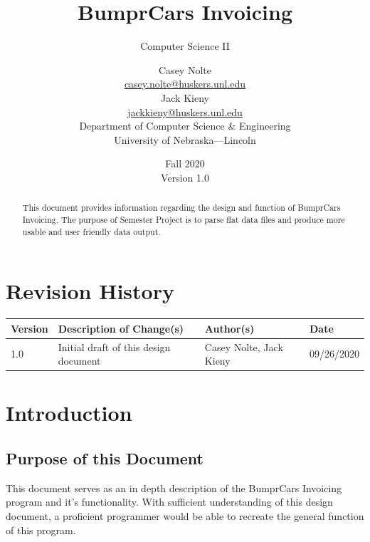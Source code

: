 \documentclass[12pt]{scrartcl} %
\title{BumprCars Invoicing}
\subtitle{Computer Science II}
\author{Casey Nolte\\
        \href{mailto:casey.nolte@huskers.unl.edu}{casey.nolte@huskers.unl.edu} \\
        Jack Kieny\\
        \href{jackkieny@huskers.unl.edu}{jackkieny@huskers.unl.edu} \\
        Department of Computer Science \& Engineering\\
        University of Nebraska---Lincoln\\
}
\date{Fall 2020 \\
      Version 1.0
}
\begin{document}
\maketitle
\thispagestyle{empty}

\vfill

\begin{abstract}
This document provides information regarding the design and function of BumprCars Invoicing. The purpose of Semester Project is to parse flat data files and produce more usable and user friendly data output. 
\end{abstract}

\newpage
\clearpage
\setcounter{page}{1}
\section*{Revision History}

\begin{tabular}{|l|l|l|l|}
\hline
Version & Description of Change(s) & Author(s) & Date \\
\hline
1.0 & Initial draft of this design document & Casey Nolte, Jack Kieny & 09/26/2020 \\
\hline
\end{tabular}

\newpage
\tableofcontents

\newpage
\section{Introduction}


\subsection{Purpose of this Document}

This document serves as an in depth description of the BumprCars Invoicing program and it's functionality. With sufficient understanding of this design document, a proficient programmer would be able to recreate the general function of this program. 
\end{document}
